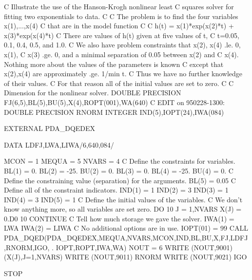 \documentclass[11pt,twoside,nolof]{starlink}
\begin{document}
\begin{terminalv}
C     Illustrate the use of the Hanson-Krogh nonlinear least
C     squares solver for fitting two exponentials to data.
C
C     The problem is to find the four variables x(1),...,x(4)
C     that are in the model function
C
C          h(t) = x(1)*exp(x(2)*t) + x(3)*exp(x(4)*t)
C     There are values of h(t) given at five values of t,
C     t=0.05, 0.1, 0.4, 0.5, and 1.0.
C     We also have problem constraints that x(2), x(4) .le. 0, x(1),
C     x(3) .ge. 0, and a minimal separation of 0.05 between x(2) and
C     x(4).  Nothing more about the values of the parameters is known
C     except that x(2),x(4) are approximately .ge. 1/min t.
C     Thus we have no further knowledge of their values.
C     For that reason all of the initial values are set to zero.
C
C     Dimension for the nonlinear solver.
      DOUBLE PRECISION FJ(6,5),BL(5),BU(5),X(4),ROPT(001),WA(640)
C  EDIT on 950228-1300:
      DOUBLE PRECISION RNORM
      INTEGER IND(5),IOPT(24),IWA(084)

      EXTERNAL PDA_DQEDEX

      DATA LDFJ,LWA,LIWA/6,640,084/

      MCON = 1
      MEQUA = 5
      NVARS = 4
C     Define the constraints for variables.
      BL(1) = 0.
      BL(2) = -25.
      BU(2) = 0.
      BL(3) = 0.
      BL(4) = -25.
      BU(4) = 0.
C     Define the constraining value (separation) for the arguments.
      BL(5) = 0.05
C     Define all of the constraint indicators.
      IND(1) = 1
      IND(2) = 3
      IND(3) = 1
      IND(4) = 3
      IND(5) = 1
C     Define the initial values of the variables.
C     We don't know anything more, so all variables are set zero.
      DO 10 J = 1,NVARS
         X(J) = 0.D0
   10 CONTINUE
C     Tell how much storage we gave the solver.
      IWA(1) = LWA
      IWA(2) = LIWA
C     No additional options are in use.
      IOPT(01) = 99
      CALL PDA_DQED(PDA_DQEDEX,MEQUA,NVARS,MCON,IND,BL,BU,X,FJ,LDFJ,RNORM,IGO,
     .          IOPT,ROPT,IWA,WA)
      NOUT = 6
      WRITE (NOUT,9001) (X(J),J=1,NVARS)
      WRITE (NOUT,9011) RNORM
      WRITE (NOUT,9021) IGO

      STOP


\end{terminalv}
\end{document}
